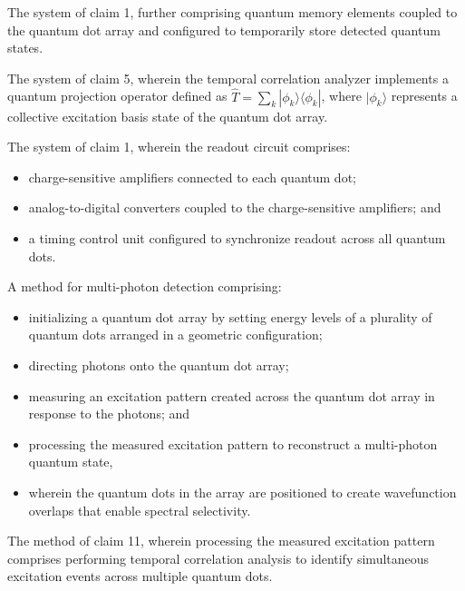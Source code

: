 \documentclass[12pt,letterpaper]{article}
\begin{document}
\begin{patentclaims}
    \item The system of claim 1, further comprising quantum memory elements coupled to the quantum dot array and configured to temporarily store detected quantum states.
    
    \item The system of claim 5, wherein the temporal correlation analyzer implements a quantum projection operator defined as $\hat{T} = \sum_k |\phi_k\rangle\langle\phi_k|$, where $|\phi_k\rangle$ represents a collective excitation basis state of the quantum dot array.
    
    \item The system of claim 1, wherein the readout circuit comprises:
    \begin{itemize}[leftmargin=2em]
        \item charge-sensitive amplifiers connected to each quantum dot;
        \item analog-to-digital converters coupled to the charge-sensitive amplifiers; and
        \item a timing control unit configured to synchronize readout across all quantum dots.
    \end{itemize}
    
    \item A method for multi-photon detection comprising:
    \begin{itemize}[leftmargin=2em]
        \item initializing a quantum dot array by setting energy levels of a plurality of quantum dots arranged in a geometric configuration;
        \item directing photons onto the quantum dot array;
        \item measuring an excitation pattern created across the quantum dot array in response to the photons; and
        \item processing the measured excitation pattern to reconstruct a multi-photon quantum state,
        \item wherein the quantum dots in the array are positioned to create wavefunction overlaps that enable spectral selectivity.
    \end{itemize}
    
    \item The method of claim 11, wherein processing the measured excitation pattern comprises performing temporal correlation analysis to identify simultaneous excitation events across multiple quantum dots.
    

\end{patentclaims}
\end{document}
